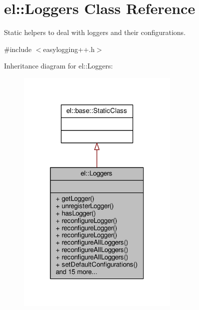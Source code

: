\hypertarget{classel_1_1Loggers}{}\section{el\+:\+:Loggers Class Reference}
\label{classel_1_1Loggers}


Static helpers to deal with loggers and their configurations.  




{\ttfamily \#include $<$easylogging++.\+h$>$}



Inheritance diagram for el\+:\+:Loggers\+:
\nopagebreak
\begin{figure}[H]
\begin{center}
\leavevmode
\includegraphics[width=220pt]{df/de8/classel_1_1Loggers__inherit__graph}
\end{center}
\end{figure}


